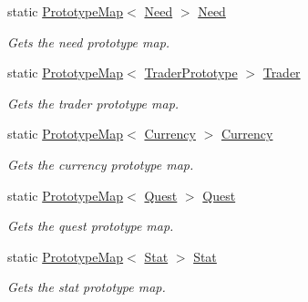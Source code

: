 \begin{DoxyCompactItemize}
static \hyperlink{class_prototype_map}{Prototype\+Map}$<$ \hyperlink{class_project_porcupine_1_1_entities_1_1_need}{Need} $>$ \hyperlink{class_prototype_manager_adda5a92ee60a9f46450cf90a7e900df6}{Need}
\begin{DoxyCompactList}\small\item\em Gets the need prototype map. \end{DoxyCompactList}\item 
static \hyperlink{class_prototype_map}{Prototype\+Map}$<$ \hyperlink{class_trader_prototype}{Trader\+Prototype} $>$ \hyperlink{class_prototype_manager_aa72bd66f68e462dbfeb89729a7d04d9e}{Trader}
\begin{DoxyCompactList}\small\item\em Gets the trader prototype map. \end{DoxyCompactList}\item 
static \hyperlink{class_prototype_map}{Prototype\+Map}$<$ \hyperlink{class_currency}{Currency} $>$ \hyperlink{class_prototype_manager_abb50bcd27c70b54bbbc1a7f41240a9c4}{Currency}
\begin{DoxyCompactList}\small\item\em Gets the currency prototype map. \end{DoxyCompactList}\item 
static \hyperlink{class_prototype_map}{Prototype\+Map}$<$ \hyperlink{class_quest}{Quest} $>$ \hyperlink{class_prototype_manager_a28aa7fc2756ccf3e19b09917018f1eac}{Quest}
\begin{DoxyCompactList}\small\item\em Gets the quest prototype map. \end{DoxyCompactList}\item 
static \hyperlink{class_prototype_map}{Prototype\+Map}$<$ \hyperlink{class_project_porcupine_1_1_entities_1_1_stat}{Stat} $>$ \hyperlink{class_prototype_manager_a99196c3dff2e3d67adf38c852120261b}{Stat}
\begin{DoxyCompactList}\small\item\em Gets the stat prototype map. \end{DoxyCompactList}\item 

\end{DoxyCompactItemize}
